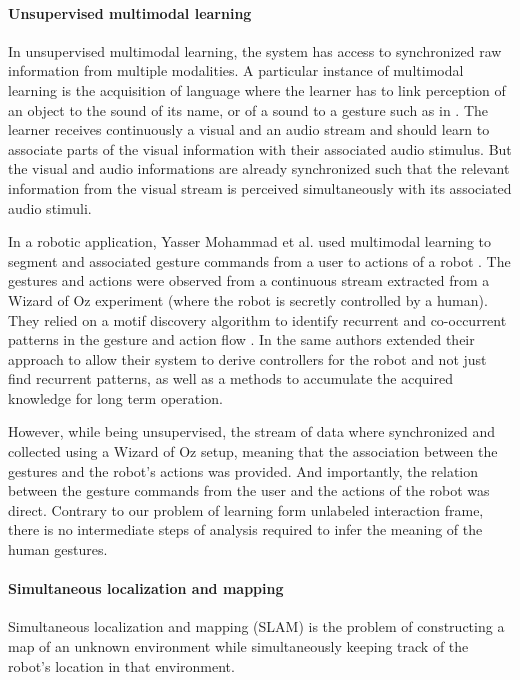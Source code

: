 \paragraph{Unsupervised multimodal learning} In unsupervised multimodal learning, the system has access to synchronized raw information from multiple modalities. A particular instance of multimodal learning is the acquisition of language where the learner has to link perception of an object to the sound of its name, or of a sound to a gesture such as in \cite{mangin2013learning}. The learner receives continuously a visual and an audio stream and should learn to associate parts of the visual information with their associated audio stimulus. But the visual and audio informations are already synchronized such that the relevant information from the visual stream is perceived simultaneously with its associated audio stimuli.

In a robotic application, Yasser Mohammad et al. used multimodal learning to segment and associated gesture commands from a user to actions of a robot \cite{mohammad2009unsupervised}. The gestures and actions were observed from a continuous stream extracted from a Wizard of Oz experiment (where the robot is secretly controlled by a human). They relied on a motif discovery algorithm to identify recurrent and co-occurrent patterns in the gesture and action flow \cite{mohammad2009constrained}. In \cite{mohammad2010learning} the same authors extended their approach to allow their system to derive controllers for the robot and not just find recurrent patterns, as well as a methods to accumulate the acquired knowledge for long term operation.

However, while being unsupervised, the stream of data where synchronized and collected using a Wizard of Oz setup, meaning that the association between the gestures and the robot's actions was provided. And importantly, the relation between the gesture commands from the user and the actions of the robot was direct. Contrary to our problem of learning form unlabeled interaction frame, there is no intermediate steps of analysis required to infer the meaning of the human gestures.

\paragraph{Simultaneous localization and mapping}

Simultaneous localization and mapping (SLAM) \cite{smith1990estimating,dissanayake2001solution} is  the problem of constructing a map of an unknown environment while simultaneously keeping track of the robot's location in that environment. 

